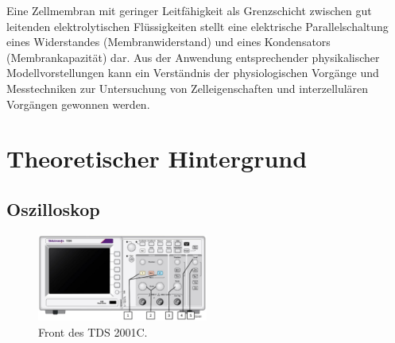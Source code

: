 Eine Zellmembran mit geringer Leitfähigkeit als Grenzschicht zwischen gut leitenden elektrolytischen Flüssigkeiten stellt eine elektrische Parallelschaltung eines Widerstandes (Membranwiderstand) und eines Kondensators (Membrankapazität) dar. Aus der Anwendung entsprechender physikalischer Modellvorstellungen kann ein Verständnis der physiologischen Vorgänge und Messtechniken zur Untersuchung von Zelleigenschaften und interzellulären Vorgängen gewonnen werden.

\section{Theoretischer Hintergrund}

\subsection{Oszilloskop} \label{chap:Oszilloskop}

\begin{figure}[hb]
	\centering
		\includegraphics[width=0.5\textwidth]{Abbildungen/TDS2000.JPG}
	\caption{Front des TDS 2001C.}
	\label{fig:TDS2000}
\end{figure}

